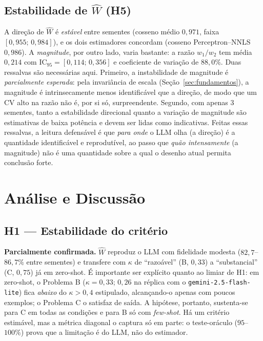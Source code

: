 \documentclass[12pt,a4paper]{article}
\newcommand{\West}{\ensuremath{\hat{W}}}   %
\begin{document}
\subsection{Estabilidade de \West{} (H5)}
\label{sec:res_estabilidade}

A direção de \West{} é \emph{estável} entre sementes (cosseno médio $0{,}971$, faixa
$[0{,}955;\,0{,}984]$), e os dois estimadores concordam (cosseno Perceptron--NNLS
$0{,}986$). A \emph{magnitude}, por outro lado, varia bastante: a razão $w_1/w_2$ tem média
$0{,}214$ com IC$_{95}=[0{,}114;\,0{,}356]$ e coeficiente de variação de $88{,}0\%$. Duas
ressalvas são necessárias aqui. Primeiro, a instabilidade de magnitude é \emph{parcialmente
esperada}: pela invariância de escala (Seção~\ref{sec:fundamentos}), a magnitude é
intrinsecamente menos identificável que a direção, de modo que um CV alto na razão não é, por
si só, surpreendente. Segundo, com apenas $3$ sementes, tanto a estabilidade direcional
quanto a variação de magnitude são estimativas de baixa potência e devem ser lidas como
indicativas. Feitas essas ressalvas, a leitura defensável é que \emph{para onde} o LLM olha
(a direção) é a quantidade identificável e reprodutível, ao passo que \emph{quão
intensamente} (a magnitude) não é uma quantidade sobre a qual o desenho atual permita
conclusão forte.

\section{Análise e Discussão}
\label{sec:discussao}

\subsection{H1 — Estabilidade do critério}
\textbf{Parcialmente confirmada.} \West{} reproduz o LLM com fidelidade modesta
($82{,}7$–$86{,}7\%$ entre sementes) e transfere com $\kappa$ de ``razoável'' (B, $0{,}33$) a
``substancial'' (C, $0{,}75$) já em zero-shot. É importante ser explícito quanto ao limiar de
H1: em zero-shot, o Problema B ($\kappa = 0{,}33$; $0{,}26$ na réplica com o
\texttt{gemini-2.5-flash-lite}) fica \emph{abaixo} do $\kappa > 0{,}4$
estipulado, alcançando-o apenas com poucos exemplos; o Problema C o satisfaz de saída. A
hipótese, portanto, sustenta-se para C em todas as condições e para B só com \emph{few-shot}.
Há um critério estimável, mas a métrica diagonal o captura só em parte: o teste-oráculo
($95$–$100\%$) prova que a limitação é do LLM, não do estimador.
\end{document}
